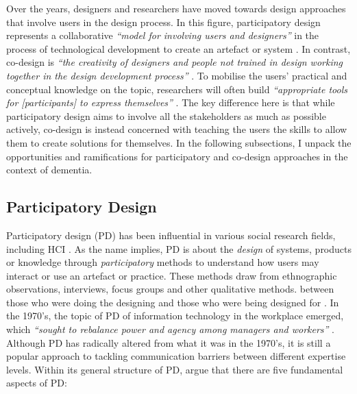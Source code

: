 Over the years, designers and researchers have moved towards design approaches that involve users in the design process.  
 In this figure, participatory design represents a collaborative \textit{``model for involving users and designers''} in the process of technological development to create an artefact or system \citep{asaro2000transforming}. In contrast, co-design is \textit{``the creativity of designers and people not trained in design working together in the design development process''} \citep{sanders2008co}. To mobilise the users' practical and conceptual knowledge on the topic, researchers will often build \textit{``appropriate tools for [participants] to express themselves''} \citep{sanders2008co}. The key difference here is that while participatory design aims to involve all the stakeholders as much as possible actively, co-design is instead concerned with teaching the users the skills to allow them to create solutions for themselves. In the following subsections, I unpack the opportunities and ramifications for participatory and co-design approaches in the context of dementia.

\subsection{Participatory Design}
\label{Method:PD}
Participatory design (PD) has been influential in various social research fields, including HCI \citep{bannon2018introduction}. As the name implies, PD is about the \textit{design} of systems, products or knowledge through \textit{participatory} methods to understand how users may interact or use an artefact or practice. These methods draw from ethnographic observations, interviews, focus groups and other qualitative methods.  between those who were doing the designing and those who were being designed for \citep{bodker_advances_2016}. In the 1970's, the topic of PD of information technology in the workplace emerged, which \textit{``sought to rebalance power and agency among managers and workers''} \citep{bannon2018introduction}. Although PD has radically altered from what it was in the 1970’s, it is still a popular approach to tackling communication barriers between different expertise levels. Within its general structure of PD, \cite{halskov2015diversity} argue that there are five fundamental aspects of PD:

